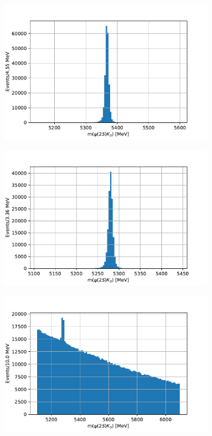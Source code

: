 \begin{figure}[tb]
  \centering
  \begin{subfigure}{.32\textwidth}
    \includegraphics[width=\linewidth]{plots/sim_hist.pdf}
  \end{subfigure}
  \begin{subfigure}{.32\textwidth}
    \includegraphics[width=\linewidth]{plots/control_sim_hist.pdf}
  \end{subfigure}
  \begin{subfigure}{.32\textwidth}
    \includegraphics[width=\linewidth]{plots/data_hist.pdf}

\end{subfigure}
\end{figure}

